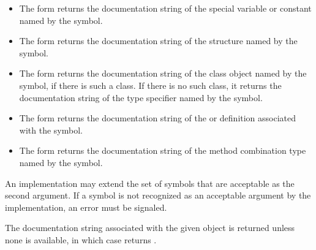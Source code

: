 \begin{defun}
\begin{itemize}
\begin{itemize}
\item
The form  returns the
documentation string of the special variable or constant named by the
symbol.

\item
The form  returns the
documentation string of the  structure named by the
symbol.

\item
The form  returns the documentation
string of the class object named by the symbol, if there is such a
class.   If there is no such class, it returns the documentation string
of the type specifier named by the symbol. 

\item
The form  returns the documentation
string of the  or  definition
associated with the symbol.

\item
The form  returns the
documentation string of the method combination type named by the
symbol.
\end{itemize}

\end{itemize}

An implementation may extend the set of symbols that are acceptable as
the second argument.  If a symbol is not recognized as an acceptable
argument by the implementation, an error must be signaled.

The documentation string associated with the given object is returned
unless none is available, in which case  returns
.
\end{defun}


